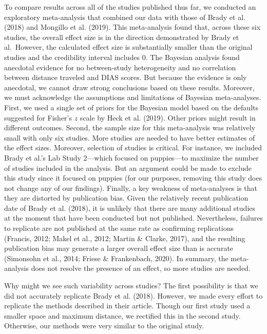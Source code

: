 \documentclass[
  pub,floatsintext]{apa6}
\begin{document}
To compare results across all of the studies published thus far, we conducted an exploratory meta-analysis that combined our data with those of Brady et al. (2018) and Mongillo et al. (2019). This meta-analysis found that, across these six studies, the overall effect size is in the direction demonstrated by Brady et al.~However, the calculated effect size is substantially smaller than the original studies and the credibility interval includes 0. The Bayesian analysis found anecdotal evidence for no between-study heterogeneity and no correlation between distance traveled and DIAS scores. But because the evidence is only anecdotal, we cannot draw strong conclusions based on these results. Moreover, we must acknowledge the assumptions and limitations of Bayesian meta-analyses. First, we used a single set of priors for the Bayesian model based on the defaults suggested for Fisher's \(z\) scale by Heck et al. (2019). Other priors might result in different outcomes. Second, the sample size for this meta-analysis was relatively small with only six studies. More studies are needed to have better estimates of the effect sizes. Moreover, selection of studies is critical. For instance, we included Brady et al.'s Lab Study 2---which focused on puppies---to maximize the number of studies included in the analysis. But an argument could be made to exclude this study since it focused on puppies (for our purposes, removing this study does not change any of our findings). Finally, a key weakness of meta-analyses is that they are distorted by publication bias. Given the relatively recent publication date of Brady et al. (2018), it is unlikely that there are many additional studies at the moment that have been conducted but not published. Nevertheless, failures to replicate are not published at the same rate as confirming replications (Francis, 2012; Makel et al., 2012; Martin \& Clarke, 2017), and the resulting publication bias may generate a larger overall effect size than is accurate (Simonsohn et al., 2014; Friese \& Frankenbach, 2020). In summary, the meta-analysis does not resolve the presence of an effect, so more studies are needed.

Why might we see such variability across studies? The first possibility is that we did not accurately replicate Brady et al. (2018). However, we made every effort to replicate the methods described in their article. Though our first study used a smaller space and maximum distance, we rectified this in the second study. Otherwise, our methods were very similar to the original study.
\end{document}
